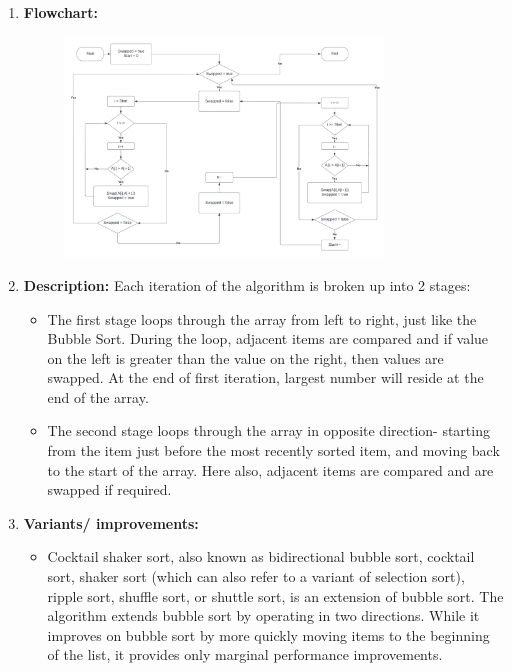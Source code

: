 \documentclass[11pt,a4paper]{article}
\begin{document}
{\begin{enumerate}[label=\textbf{\arabic*})]
\begin{algorithm}[H]
            \end{algorithm}
				\item \textbf{Flowchart:}
					\begin{figure}[H]
						\centering 
						\includegraphics[width=0.8\textwidth]{Shaker Sort}
					\end{figure}
					
				\item \textbf{Description:}
					Each iteration of the algorithm is broken up into 2 stages: 
					\begin{itemize}
						\item The first stage loops through the array from left to right, just like the Bubble Sort. During the loop, adjacent items are compared and if value on the left is greater than the value on the right, then values are swapped. At the end of first iteration, largest number will reside at the end of the array.
						\item The second stage loops through the array in opposite direction- starting from the item just before the most recently sorted item, and moving back to the start of the array. Here also, adjacent items are compared and are swapped if required.
					\end{itemize}
				\item \textbf{Variants/ improvements:}
					\begin{itemize}
					\item Cocktail shaker sort, also known as bidirectional bubble sort, cocktail sort, shaker sort (which can also refer to a variant of selection sort), ripple sort, shuffle sort, or shuttle sort, is an extension of bubble sort. The algorithm extends bubble sort by operating in two directions. While it improves on bubble sort by more quickly moving items to the beginning of the list, it provides only marginal performance improvements.
                    

\end{itemize}
\end{enumerate}}
\end{document}
